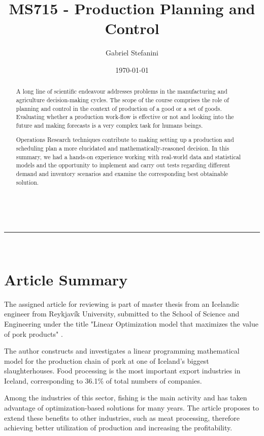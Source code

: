 \documentclass[a4paper,12pt]{article}
\makeatletter
\renewcommand{\maketitle}{
\begin{center}
\vspace{2ex}
{\normalfont \textsc{\@title}}
\vspace{1ex}
\\
\rule{\linewidth}{0.5pt}
\\
\@author \hfill \@date
\vspace{2ex}
\end{center}
}
\makeatother
\begin{document}
\title{MS715 - Production Planning and Control}

\author{Gabriel Stefanini}

\date{\today}

\maketitle

\begin{abstract}
   A long line of scientific endeavour addresses problems in the 
   manufacturing and agriculture decision-making cycles. The scope of the course comprises the role of planning and control in the context of production of a good or a set of goods. Evaluating whether a production work-flow is effective or not and looking into the future and making forecasts is a very complex task for humans beings.
   
   Operations Research techniques contribute to making setting up a production and scheduling plan a more elucidated and mathematically-reasoned decision. In this summary, we had a hands-on experience working with real-world data and statistical models and the opportunity to implement and carry out tests regarding different demand and inventory scenarios and examine the corresponding best obtainable solution. 
\end{abstract}

\section{Article Summary}
    The assigned article for reviewing is part of master thesis from an Icelandic engineer from Reykjavík University, submitted to the School of Science and Engineering 
    under the title "Linear Optimization model that maximizes the value of pork products" \cite{reynisdottir}. 
    
    The author constructs and investigates a linear programming mathematical model for the production chain of pork at one of Iceland's biggest slaughterhouses. Food processing is the most important export industries in Iceland, corresponding to 36.1\% of total numbers of companies.
    
    Among the industries of this sector, fishing is the main activity and has taken advantage of optimization-based solutions for many years. The article proposes to extend these benefits to other industries, such as meat processing,  therefore achieving better utilization of production and increasing the profitability.
 
\end{document}
